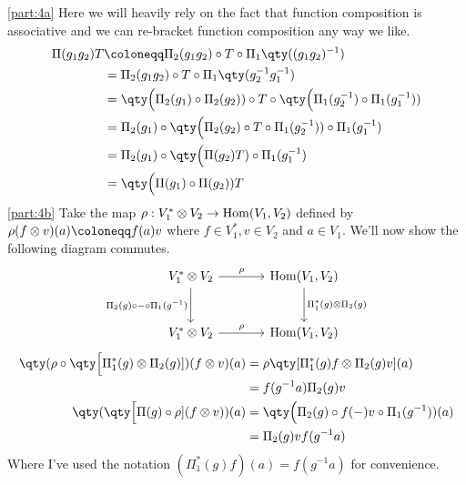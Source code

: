\documentclass[
	pages,
	boxes,
	color=WildStrawberry
]{homework}
\begin{document}
\begin{solution}
	\ref{part:4a}
	Here we will heavily rely on the fact that function composition is associative and we can re-bracket function composition any way we like.
	\begin{align*}
		\Pi(g_1g_2)T & \defeq \Pi_2(g_1g_2)\circ T \circ \Pi_1\qty((g_1g_2)^{-1})                                         \\
		             & = \Pi_2(g_1g_2)\circ T \circ \Pi_1\qty(g_2^{-1}g_1^{-1})                                           \\
		             & = \qty\Big(\Pi_2(g_1)\circ \Pi_2(g_2))\circ T \circ \qty\Big(\Pi_1(g_2^{-1})\circ \Pi_1(g_1^{-1})) \\
		             & = \Pi_2(g_1)\circ \qty\Big(\Pi_2(g_2)\circ T \circ \Pi_1(g_2^{-1})) \circ \Pi_1(g_1^{-1})          \\
		             & = \Pi_2(g_1)\circ \qty\Big(\Pi(g_2)T) \circ \Pi_1(g_1^{-1})                                        \\
		             & = \qty\Big(\Pi(g_1) \circ \Pi(g_2))T
	\end{align*}
	\ref{part:4b}
	Take the map $\rho: V_1^*\otimes V_2 \to \operatorname{Hom}(V_1, V_2)$ defined by $\rho(f\otimes v)(a) \defeq f(a)v$ where $f\in V_1^*, v\in V_2$ and $a\in V_1$. We'll now show the following diagram commutes.
	\begin{equation*}
		\begin{tikzcd}[row sep=large, column sep=large]
			V_1^*\otimes V_2 \arrow{r}{\rho} \arrow[swap]{d}{\Pi_2(g)\circ - \circ \Pi_1(g^{-1})} & \Hom(V_1, V_2) \arrow{d}{\Pi_1^*(g)\otimes \Pi_2(g)} \\
			V_1^*\otimes V_2 \arrow{r}{\rho} & \Hom(V_1, V_2)
		\end{tikzcd}
	\end{equation*}
	\begin{align*}
		\qty(\rho\circ \qty\Big[\Pi_1^*(g)\otimes \Pi_2(g)])(f\otimes v)(a) & = \rho\qty[\Pi^{*}_1(g)f\otimes \Pi_2(g)v](a)         \\
		                                                                    & = f(g^{-1}a)\Pi_2(g)v                                 \\
		\qty(\qty\Big[\Pi(g)\circ\rho](f\otimes v))(a)                      & = \qty\Big(\Pi_2(g)\circ f(-)v\circ \Pi_1(g^{-1}))(a) \\
		                                                                    & = \Pi_2(g)v f(g^{-1}a)
	\end{align*}
	Where I've used the notation $(\Pi^{*}_1(g)f)(a) = f(g^{-1}a)$ for convenience.


\end{solution}
\end{document}
